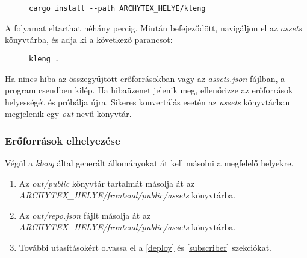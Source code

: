 \begin{figure}[h]
    \centering
    \begin{minipage}{.7\textwidth}
        \begin{lstlisting}
cargo install --path ARCHYTEX_HELYE/kleng
\end{lstlisting}
    \end{minipage}
\end{figure}

A folyamat eltarthat néhány percig. Miután befejeződött, navigáljon el az \emph{assets} könyvtárba,
és adja ki a következő parancsot:

\begin{figure}[h]
    \centering
    \begin{minipage}{.7\textwidth}
        \begin{lstlisting}
kleng .
\end{lstlisting}
    \end{minipage}
\end{figure}

Ha nincs hiba az összegyűjtött erőforrásokban vagy az \emph{assets.json} fájlban, a program
csendben kilép. Ha hibaüzenet jelenik meg, ellenőrizze az erőforrások helyességét és próbálja
újra. Sikeres konvertálás esetén az \emph{assets} könyvtárban megjelenik egy \emph{out}
nevű könyvtár.

\subsubsection{Erőforrások elhelyezése}

Végül a \emph{kleng} által generált állományokat át kell másolni a megfelelő helyekre.

\begin{enumerate}
    \item Az \emph{out/public} könyvtár tartalmát másolja át az \\
          \emph{ARCHYTEX\_HELYE/frontend/public/assets} könyvtárba.

    \item Az \emph{out/repo.json} fájlt másolja át az \\
          \emph{ARCHYTEX\_HELYE/frontend/public/assets} könyvtárba.

    \item További utasításokért olvassa el a \ref{deploy} és \ref{subscriber} szekciókat.

\end{enumerate}